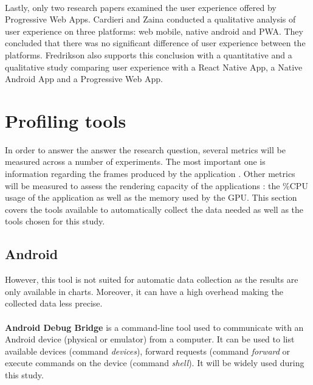 \paragraph{}
Lastly, only two research papers examined the user experience offered by Progressive Web Apps. Cardieri and Zaina \cite{PWA_UX_comparison_study} conducted a qualitative analysis of user experience on three platforms: web mobile, native android and PWA. They concluded that there was no significant difference of user experience between the platforms. Fredrikson \cite{emulating_native_w_crossplatform} also supports this conclusion with a quantitative and a qualitative study comparing user experience with a React Native App, a Native Android App and a Progressive Web App. 
\fi


\section{Profiling tools}

In order to answer the answer the research question, several metrics will be measured across a number of experiments. The most important one is information regarding the frames produced by the application
. Other metrics will be measured to assess the rendering capacity of the applications : the \%CPU usage of the application as well as the memory used by the GPU. This section covers the tools available to automatically collect the data needed as well as the tools chosen for this study.  


\subsection{Android}
However, this tool is not suited for automatic data collection as the results are only available in charts. Moreover, it can have a high overhead \cite{nanoscope} making the collected data less precise.

\paragraph{}
\textbf{Android Debug Bridge} \cite{adb} is a command-line tool used to communicate with an Android device (physical or emulator) from a computer. It can be used to list available devices (command \textit{devices}), forward requests (command \textit{forward} or execute commands on the device (command \textit{shell}). It will be widely used during this study. 

